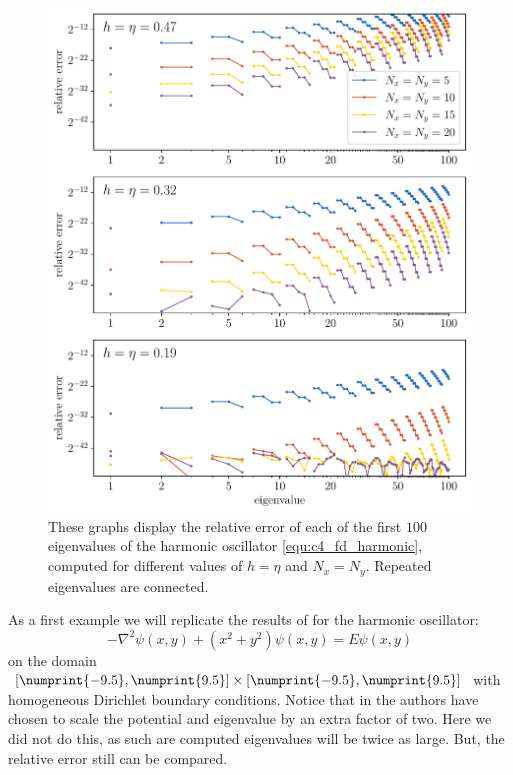 \begin{figure}
    \begin{center}
        \includegraphics[width=\textwidth]{img/chapter4/fd_harmonic.pdf}
    \end{center}
    \caption{These graphs display the relative error of each of the first $100$ eigenvalues of the harmonic oscillator \eqref{equ:c4_fd_harmonic}, computed for different values of $h = \eta$ and $N_x = N_y$. Repeated eigenvalues are connected.}
    \label{fig:c4_fd_harmonic}
\end{figure}

As a first example we will replicate the results of \cite{wang_new_2009} for the harmonic oscillator:
\begin{equation}\label{equ:c4_fd_harmonic}
    -\nabla^2 \psi(x, y) + \left(x^2 + y^2\right) \psi(x, y) = E \psi(x, y)
\end{equation}
on the domain $[\numprint{-9.5}, \numprint{9.5}] \times [\numprint{-9.5}, \numprint{9.5}]$ with homogeneous Dirichlet boundary conditions. Notice that in \cite{wang_new_2009} the authors have chosen to scale the potential and eigenvalue by an extra factor of two. Here we did not do this, as such are computed eigenvalues will be twice as large. But, the relative error still can be compared.

